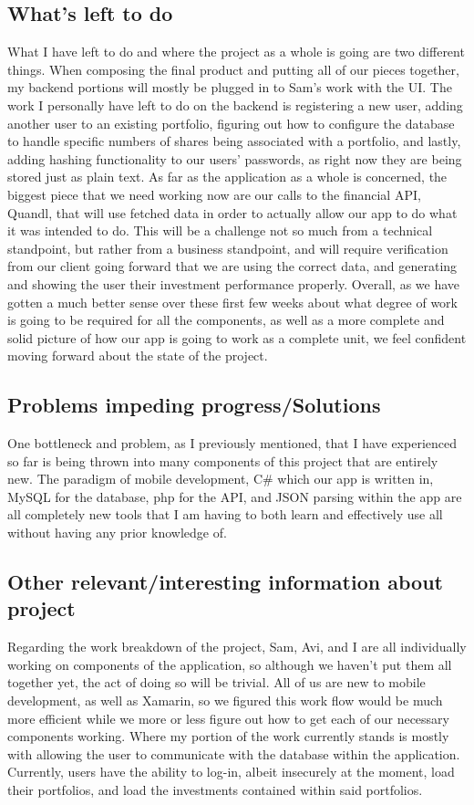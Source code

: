 \documentclass[letterpaper,10pt,titlepage,journal,compsoc,draftclsnofoot,onecolumn]{IEEEtran}
\begin{document}
\subsection{What's left to do}

What I have left to do and where the project as a whole is going are two different things. When composing the final product and putting all of our pieces together, my backend portions will mostly be plugged in to Sam’s work with the UI. The work I personally have left to do on the backend is registering a new user, adding another user to an existing portfolio, figuring out how to configure the database to handle specific numbers of shares being associated with a portfolio, and lastly, adding hashing functionality to our users’ passwords, as right now they are being stored just as plain text. As far as the application as a whole is concerned, the biggest piece that we need working now are our calls to the financial API, Quandl, that will use fetched data in order to actually allow our app to do what it was intended to do. This will be a challenge not so much from a technical standpoint, but rather from a business standpoint, and will require verification from our client going forward that we are using the correct data, and generating and showing the user their investment performance properly. Overall, as we have gotten a much better sense over these first few weeks about what degree of work is going to be required for all the components, as well as a more complete and solid picture of how our app is going to work as a complete unit, we feel confident moving forward about the state of the project.

\subsection{Problems impeding progress/Solutions}

One bottleneck and problem, as I previously mentioned, that I have experienced so far is being thrown into many components of this project that are entirely new. The paradigm of mobile development, C\# which our app is written in, MySQL for the database, php for the API, and JSON parsing within the app are all completely new tools that I am having to both learn and effectively use all without having any prior knowledge of.

\subsection{Other relevant/interesting information about project}
Regarding the work breakdown of the project, Sam, Avi, and I are all individually working on components of the application, so although we haven’t put them all together yet, the act of doing so will be trivial. All of us are new to mobile development, as well as Xamarin, so we figured this work flow would be much more efficient while we more or less figure out how to get each of our necessary components working. Where my portion of the work currently stands is mostly with allowing the user to communicate with the database within the application. Currently, users have the ability to log-in, albeit insecurely at the moment, load their portfolios, and load the investments contained within said portfolios.  
\end{document}
